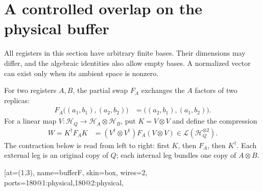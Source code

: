 \section{A controlled overlap on the physical buffer}
\label{sec:physical_buffer_overlap}

All registers in this section have arbitrary finite bases. Their dimensions
may differ, and the algebraic identities also allow empty bases. A normalized
vector can exist only when its ambient space is nonzero.

\begin{definition}
    \label{def:physical_buffer_compression}
    \leanok
    For two registers $A,B$, the partial swap $F_A$ exchanges the $A$
    factors of two replicas:
    \begin{align}
        F_A\bigl((a_1,b_1),(a_2,b_2)\bigr)
        &=\bigl((a_2,b_1),(a_1,b_2)\bigr).
        \label{eq:buffer_partial_swap}
    \end{align}
    For a linear map $V:\mathcal H_Q\to\mathcal H_A\otimes\mathcal H_B$,
    put $K=V\otimes V$ and define the compression
    \begin{align}
        W=K^\dagger F_AK
        &=(V^\dagger\otimes V^\dagger)F_A(V\otimes V)
        \in\mathcal L(\mathcal H_Q^{\otimes2}).
        \label{eq:buffer_compression}
    \end{align}
    The contraction below is read from left to right: first $K$, then
    $F_A$, then $K^\dagger$. Each external leg is an original copy of $Q$;
    each internal leg bundles one copy of $A\otimes B$.
    \begin{tenkzequation}
        \tenkzkernel
        \begin{tenkz}[rows={wire,wire}, cols=5, bonds=none]
            \tn[at=(1,3), name=bufferF, skin=box, wires=2,
                ports={180@1:physical,180@2:physical,
}
\end{tenkz}
\end{tenkzequation}
\end{definition}
